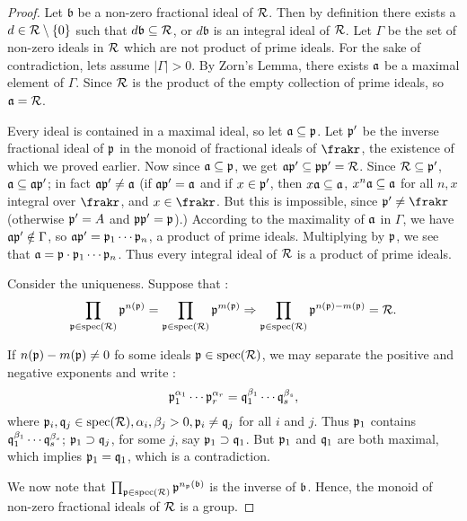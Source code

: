 \begin{proof}
  Let $\mathfrak{b}$ be a non-zero fractional ideal of $\mathcal{R}$. Then by definition there exists a $d\in \mathcal{R}\setminus \{0\}$ such that $d\mathfrak{b}\subseteq \mathcal{R}$, or $d\mathfrak{b}$ is an integral ideal of $\mathcal{R}$. Let $\Gamma$ be the set of non-zero ideals in $\mathcal{R}$ which are not product of prime ideals. For the sake of contradiction, lets assume $|\Gamma|>0$. By Zorn's Lemma, there exists $\mathfrak{a}$ be a maximal element of $\Gamma$. Since $\mathcal{R}$ is the product of the empty collection of prime ideals, so $\mathfrak{a} = \mathcal{R}$.

   Every ideal is contained in a maximal ideal, so let $\mathfrak{a} \subseteq \mathfrak{p}$. Let $\mathfrak{p}'$ be the inverse fractional ideal of $\mathfrak{p}$ in the monoid of fractional ideals of $\frakr$, the existence of which we proved earlier. Now since $\mathfrak{a} \subseteq \mathfrak{p}$, we get $\mathfrak{a}\mathfrak{p}' \subseteq \mathfrak{p}\mathfrak{p}' = \mathcal{R}$. Since $\mathcal{R} \subseteq \mathfrak{p}'$, $\mathfrak{a} \subseteq \mathfrak{a}\mathfrak{p}'$; in fact $\mathfrak{a}\mathfrak{p}'  \neq \mathfrak{a}$ (if
    $\mathfrak{a}\mathfrak{p}' = \mathfrak{a}$ and if $x\in \mathfrak{p}'$, then $x\mathfrak{a} \subseteq \mathfrak{a}$, $x^n\mathfrak{a}\subseteq \mathfrak{a}$ for all $n,x$ integral over $\frakr$, and $x\in \frakr$. But this is impossible, since $\frakp' \neq \frakr$ (otherwise $\mathfrak{p}' = A$ and $\mathfrak{p}\mathfrak{p}'=\mathfrak{p}$).) According to the maximality of $\mathfrak{a}$ in $\Gamma$, we have
     $\mathfrak{a}\mathfrak{p}'\notin \Gamma$, so $\mathfrak{a}\mathfrak{p}' = \mathfrak{p}_1\cdots\mathfrak{p}_n$,  a product of prime ideals. Multiplying by $\mathfrak{p}$, we see that $\mathfrak{a} = \mathfrak{p}\cdot\mathfrak{p}_1\cdots \mathfrak{p}_n$. Thus every integral ideal of $\mathcal{R}$ is a product of prime ideals.


  Consider the uniqueness. Suppose that :
  \[\prod_{\mathfrak{p} \in \operatorname{spec}(\mathcal{R})} \mathfrak{p}^{n(\mathfrak{p})} = \prod_{\mathfrak{p} \in \operatorname{spec}(\mathcal{R})} \mathfrak{p}^{m(\mathfrak{p})} \Rightarrow \prod_{\mathfrak{p} \in \operatorname{spec}(\mathcal{R})} \mathfrak{p}^{n(\mathfrak{p})- m(\mathfrak{p})} = \mathcal{R}.\]

  If $n(\mathfrak{p})-m(\mathfrak{p})\neq 0$ fo some ideals $\mathfrak{p} \in \operatorname{spec}(\mathcal{R})$, we may separate the positive and negative exponents and write :
  \[\mathfrak{p}_1^{\alpha_1}\cdots \mathfrak{p}_r^{\alpha_r}= \mathfrak{q}_1^{\beta_1}\cdots\mathfrak{q}_s^{\beta_s},\]
  where $\mathfrak{p}_i, \mathfrak{q}_j\in \operatorname{spec}(\mathcal{R}), \alpha_i, \beta_j >0, \mathfrak{p}_i \neq \mathfrak{q}_j$ for all $i$ and $j$. Thus $\mathfrak{p}_1$ contains $ \mathfrak{q}_1^{\beta_1}\cdots\mathfrak{q}_s^{\beta_s}$; $\mathfrak{p}_1 \supset \mathfrak{q}_j$,
   for some $j$, say $\mathfrak{p}_1 \supset \mathfrak{q}_1$. But $\mathfrak{p}_1$ and $\mathfrak{q}_1$ are both maximal, which implies $\mathfrak{p}_1=\mathfrak{q}_1$, which is a contradiction.

   We now note that $\prod_{\mathfrak{p} \in \operatorname{spec}(\mathcal{R})}\mathfrak{p}^{n_{\mathfrak{p}}(\mathfrak{b})}$ is the inverse of $\mathfrak{b}$. Hence, the monoid of non-zero fractional ideals of $\mathcal{R}$ is a group.
\end{proof}
